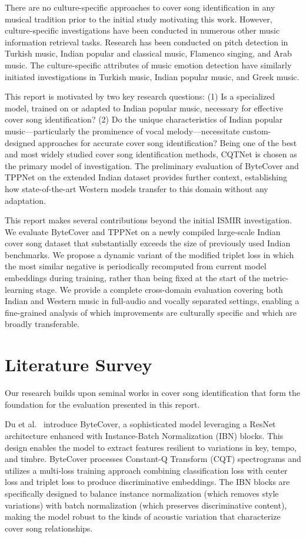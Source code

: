 \documentclass[conference]{IEEEtran}
\begin{document}
There are no culture-specific approaches to cover song identification in any musical tradition prior to the initial study motivating this work. However, culture-specific investigations have been conducted in numerous other music information retrieval tasks. Research has been conducted on pitch detection in Turkish music, Indian popular and classical music, Flamenco singing, and Arab music. The culture-specific attributes of music emotion detection have similarly initiated investigations in Turkish music, Indian popular music, and Greek music.

This report is motivated by two key research questions: (1) Is a specialized model, trained on or adapted to Indian popular music, necessary for effective cover song identification? (2) Do the unique characteristics of Indian popular music—particularly the prominence of vocal melody—necessitate custom-designed approaches for accurate cover song identification? Being one of the best and most widely studied cover song identification methods, CQTNet is chosen as the primary model of investigation. The preliminary evaluation of ByteCover and TPPNet on the extended Indian dataset provides further context, establishing how state-of-the-art Western models transfer to this domain without any adaptation.

This report makes several contributions beyond the initial ISMIR investigation. We evaluate ByteCover and TPPNet on a newly compiled large-scale Indian cover song dataset that substantially exceeds the size of previously used Indian benchmarks. We propose a dynamic variant of the modified triplet loss in which the most similar negative is periodically recomputed from current model embeddings during training, rather than being fixed at the start of the metric-learning stage. We provide a complete cross-domain evaluation covering both Indian and Western music in full-audio and vocally separated settings, enabling a fine-grained analysis of which improvements are culturally specific and which are broadly transferable.

\section{Literature Survey}

Our research builds upon seminal works in cover song identification that form the foundation for the evaluation presented in this report.

Du et al.~\cite{du2021bytecover} introduce ByteCover, a sophisticated model leveraging a ResNet architecture enhanced with Instance-Batch Normalization (IBN) blocks. This design enables the model to extract features resilient to variations in key, tempo, and timbre. ByteCover processes Constant-Q Transform (CQT) spectrograms and utilizes a multi-loss training approach combining classification loss with center loss and triplet loss to produce discriminative embeddings. The IBN blocks are specifically designed to balance instance normalization (which removes style variations) with batch normalization (which preserves discriminative content), making the model robust to the kinds of acoustic variation that characterize cover song relationships.
\end{document}
